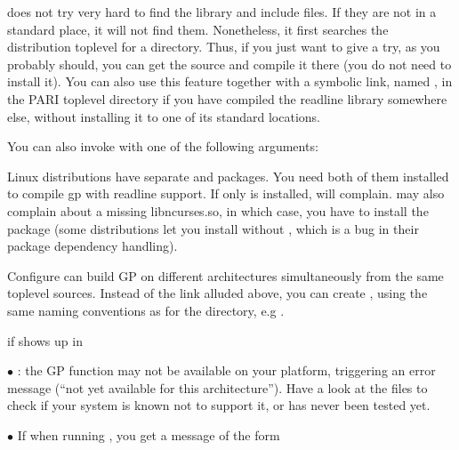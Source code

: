  does not try very hard to find the  library and
include files. If they are not in a standard place, it will not find them.
Nonetheless, it first searches the distribution toplevel for a 
directory. Thus, if you just want to give  a try, as you
probably should, you can get the source and compile it there (you do not need
to install it). You can also use this feature together with a symbolic link,
named , in the PARI toplevel directory if you have compiled the
readline library somewhere else, without installing it to one of its standard
locations. 

You can also invoke  with one of the following arguments:




 Linux distributions have separate  and
 packages. You need both of them installed to compile gp
with readline support. If only  is installed, 
will complain.  may also complain about a missing
libncurses.so, in which case, you have to install the
 package (some distributions let you install
 without , which is a bug in their
package dependency handling).

 Configure can build GP on different architectures
simultaneously from the same toplevel sources. Instead of the 
link alluded above, you can create ,
using the same naming conventions as for the  directory,
e.g .


 if  shows up in 

$\bullet$ : the GP function  may not be available on
your platform, triggering an error message (``not yet available for this
architecture''). Have a look at the  files to check if your
system is known not to support it, or has never been tested yet.

$\bullet$ If when running , you get a message of the form

